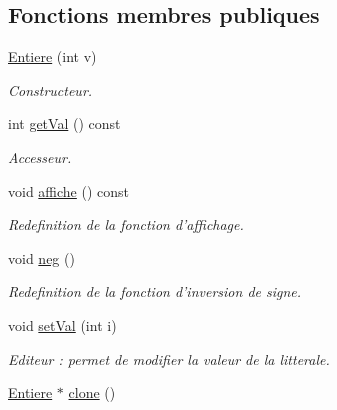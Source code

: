 \subsection*{Fonctions membres publiques}
\begin{CompactItemize}
\item 
\hyperlink{class_entiere_ff8499408d074e26c267c2e1c6e696b8}{Entiere} (int v)
\begin{CompactList}\small\item\em Constructeur. \item\end{CompactList}\item 
int \hyperlink{class_entiere_d2517d3ce704cca0b13cfa0ee8c24cfd}{getVal} () const 
\begin{CompactList}\small\item\em Accesseur. \item\end{CompactList}\item 
\hypertarget{class_entiere_58d2569469b5d4765d815be15171a041}{
void \hyperlink{class_entiere_58d2569469b5d4765d815be15171a041}{affiche} () const }
\label{class_entiere_58d2569469b5d4765d815be15171a041}

\begin{CompactList}\small\item\em Redefinition de la fonction d'affichage. \item\end{CompactList}\item 
\hypertarget{class_entiere_bb972ef0ad74814e4abf22c0cd3a2b55}{
void \hyperlink{class_entiere_bb972ef0ad74814e4abf22c0cd3a2b55}{neg} ()}
\label{class_entiere_bb972ef0ad74814e4abf22c0cd3a2b55}

\begin{CompactList}\small\item\em Redefinition de la fonction d'inversion de signe. \item\end{CompactList}\item 
void \hyperlink{class_entiere_c3dae32e641989e217776e93005ec570}{setVal} (int i)
\begin{CompactList}\small\item\em Editeur : permet de modifier la valeur de la litterale. \item\end{CompactList}\item 
\hypertarget{class_entiere_94592b044a5bee1b5c2ef5e6b3fd8e64}{
\hyperlink{class_entiere}{Entiere} $\ast$ \hyperlink{class_entiere_94592b044a5bee1b5c2ef5e6b3fd8e64}{clone} ()}
\label{class_entiere_94592b044a5bee1b5c2ef5e6b3fd8e64}


\end{CompactItemize}
